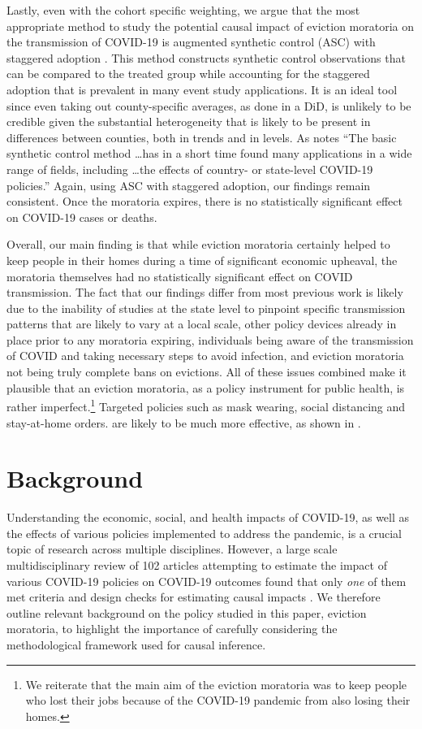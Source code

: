 \documentclass[12pt]{amsart}
\begin{document}
Lastly, even with the cohort specific weighting, we argue that the most appropriate method to study the potential causal impact of eviction moratoria on the transmission of COVID-19 is augmented synthetic control (ASC) with staggered adoption \cite{BEN-MICHAEL_ETAL:2021}. This method constructs synthetic control observations that can be compared to the treated group while accounting for the staggered adoption that is prevalent in many event study applications. It is an ideal tool since even taking out county-specific averages, as done in a DiD, is unlikely to be credible given the substantial heterogeneity that is likely to be present in differences between counties, both in trends and in levels. As  notes ``The basic synthetic control method \dots has in a short time found many applications in a wide range of fields, including \dots the effects of country- or state-level COVID-19 policies.'' Again, using ASC with staggered adoption, our findings remain consistent. Once the moratoria expires, there is no statistically significant effect on COVID-19 cases or deaths. 

Overall, our main finding is that while eviction moratoria certainly helped to keep people in their homes during a time of significant economic upheaval, the moratoria themselves had no statistically significant effect on COVID transmission. The fact that our findings differ from most previous work is likely due to the inability of studies at the state level to pinpoint specific transmission patterns that are likely to vary at a local scale, other policy devices already in place prior to any moratoria expiring, individuals being aware of the transmission of COVID and taking necessary steps to avoid infection, and eviction moratoria not being truly complete bans on evictions. All of these issues combined make it plausible that an eviction moratoria, as a policy instrument for public health, is rather imperfect.\footnote{We reiterate that the main aim of the eviction moratoria was to keep people who lost their jobs because of the COVID-19 pandemic from also losing their homes.} Targeted policies such as mask wearing, social distancing and stay-at-home orders. are likely to be much more effective, as shown in .  

\section{Background}

Understanding the economic, social, and health impacts of COVID-19, as well as the effects of various policies implemented to address the pandemic, is a crucial topic of research across multiple disciplines. However, a large scale multidisciplinary review of 102 articles attempting to estimate the impact of various COVID-19 policies on COVID-19 outcomes found that only \textit{one} of them met criteria and design checks for estimating causal impacts \cite{haber2021problems}. We therefore outline relevant background on the policy studied in this paper, eviction moratoria, to highlight the importance of carefully considering the methodological framework used for causal inference. 
\end{document}
